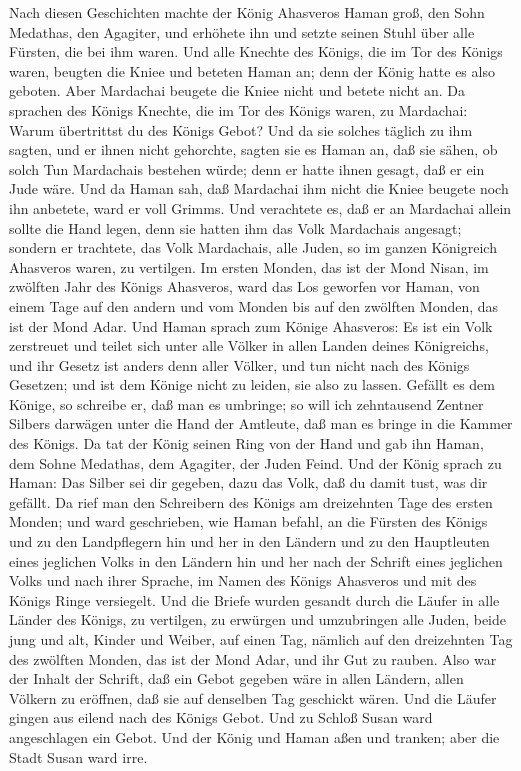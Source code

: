  Nach diesen Geschichten machte der König Ahasveros Haman
groß, den Sohn Medathas, den Agagiter, und erhöhete ihn und setzte
seinen Stuhl über alle Fürsten, die bei ihm waren.  Und alle
Knechte des Königs, die im Tor des Königs waren, beugten die Kniee und
beteten Haman an; denn der König hatte es also geboten. Aber Mardachai
beugete die Kniee nicht und betete nicht an.  Da sprachen
des Königs Knechte, die im Tor des Königs waren, zu Mardachai: Warum
übertrittst du des Königs Gebot?  Und da sie solches täglich
zu ihm sagten, und er ihnen nicht gehorchte, sagten sie es Haman an, daß
sie sähen, ob solch Tun Mardachais bestehen würde; denn er hatte ihnen
gesagt, daß er ein Jude wäre.  Und da Haman sah, daß
Mardachai ihm nicht die Kniee beugete noch ihn anbetete, ward er voll
Grimms.  Und verachtete es, daß er an Mardachai allein
sollte die Hand legen, denn sie hatten ihm das Volk Mardachais angesagt;
sondern er trachtete, das Volk Mardachais, alle Juden, so im ganzen
Königreich Ahasveros waren, zu vertilgen.  Im ersten Monden,
das ist der Mond Nisan, im zwölften Jahr des Königs Ahasveros, ward das
Los geworfen vor Haman, von einem Tage auf den andern und vom Monden bis
auf den zwölften Monden, das ist der Mond Adar.  Und Haman
sprach zum Könige Ahasveros: Es ist ein Volk zerstreuet und teilet sich
unter alle Völker in allen Landen deines Königreichs, und ihr Gesetz ist
anders denn aller Völker, und tun nicht nach des Königs Gesetzen; und
ist dem Könige nicht zu leiden, sie also zu lassen.  Gefällt
es dem Könige, so schreibe er, daß man es umbringe; so will ich
zehntausend Zentner Silbers darwägen unter die Hand der Amtleute, daß
man es bringe in die Kammer des Königs.  Da tat der König
seinen Ring von der Hand und gab ihn Haman, dem Sohne Medathas, dem
Agagiter, der Juden Feind.  Und der König sprach zu Haman:
Das Silber sei dir gegeben, dazu das Volk, daß du damit tust, was dir
gefällt.  Da rief man den Schreibern des Königs am
dreizehnten Tage des ersten Monden; und ward geschrieben, wie Haman
befahl, an die Fürsten des Königs und zu den Landpflegern hin und her in
den Ländern und zu den Hauptleuten eines jeglichen Volks in den Ländern
hin und her nach der Schrift eines jeglichen Volks und nach ihrer
Sprache, im Namen des Königs Ahasveros und mit des Königs Ringe
versiegelt.  Und die Briefe wurden gesandt durch die Läufer
in alle Länder des Königs, zu vertilgen, zu erwürgen und umzubringen
alle Juden, beide jung und alt, Kinder und Weiber, auf einen Tag,
nämlich auf den dreizehnten Tag des zwölften Monden, das ist der Mond
Adar, und ihr Gut zu rauben.  Also war der Inhalt der
Schrift, daß ein Gebot gegeben wäre in allen Ländern, allen Völkern zu
eröffnen, daß sie auf denselben Tag geschickt wären.  Und
die Läufer gingen aus eilend nach des Königs Gebot. Und zu Schloß Susan
ward angeschlagen ein Gebot. Und der König und Haman aßen und tranken;
aber die Stadt Susan ward irre.

